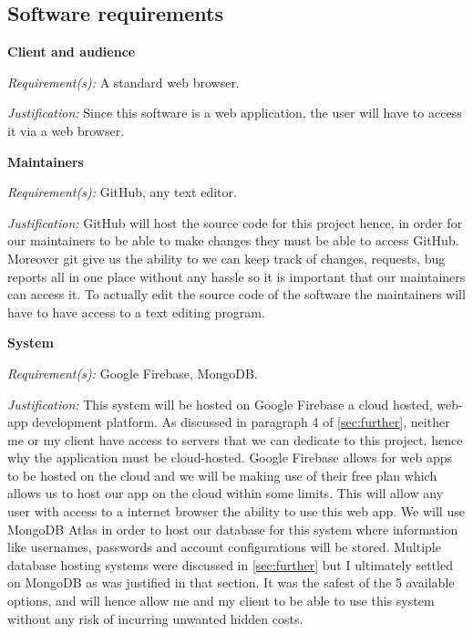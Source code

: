 \subsection{Software requirements}

\textsf{\bfseries Client and audience} \\ \vspace{0.1cm}

\textit{Requirement(s):} A standard web browser. \\ \vspace{0.1cm}

\textit{Justification:}
Since this software is a web application, the user will
have to access it via a web browser.
\\ \vspace{0.2cm}

\textsf{\bfseries Maintainers} \\ \vspace{0.1cm}

\textit{Requirement(s):} GitHub, any text editor. \\ \vspace{0.1cm}

\textit{Justification:}
GitHub will host the source code for this project hence,
in order for our maintainers to be able to make changes
they must be able to access GitHub. Moreover git give us
the ability to we can keep track of changes, requests,
bug reports all in one place without any hassle so it is
important that our maintainers can access it. To actually
edit the source code of the software the maintainers will
have to have access to a text editing program.
\\ \vspace{0.2cm}

\textsf{\bfseries System} \\ \vspace{0.1cm}

\textit{Requirement(s):} Google Firebase, MongoDB. \\ \vspace{0.1cm}

\textit{Justification:}
This system will be hosted on Google Firebase a cloud hosted,
web-app development platform. As discussed in paragraph 4 of
\ref{sec:further}, neither me or my client have access to
servers that we can dedicate to this project, hence why the
application must be cloud-hosted. Google Firebase allows for
web apps to be hosted on the cloud and we will be making use
of their free plan which allows us to host our app on the
cloud within some limits. This will allow any user with
access to a internet browser the ability to use this web
app. We will use MongoDB
Atlas in order to host our database for this system where
information like usernames, passwords and account
configurations will be stored. Multiple database hosting
systems were discussed in \ref{sec:further} but I ultimately
settled on MongoDB as was justified in that section. It was
the safest of the 5 available options, and will hence allow
me and my client to be able to use this system without any
risk of incurring unwanted hidden costs.

